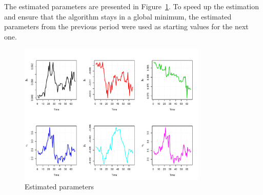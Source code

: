 The estimated parameters are presented in Figure~\ref{fig:paramdevel}. To speed up the estimation and ensure that the algorithm stays in a global minimum, the estimated parameters from the previous period were used as starting values for the next one.

\begin{figure}[htb]
  \begin{center}
\includegraphics[width=0.8\textwidth]{paramdevel}
  \caption{Estimated parameters}
\label{fig:paramdevel}
\end{center}
\end{figure}



